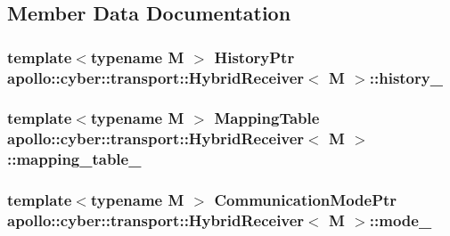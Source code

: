 \subsection{Member Data Documentation}
\hypertarget{classapollo_1_1cyber_1_1transport_1_1HybridReceiver_a71fe92773a83ee153382b6b7f9e8c8a7}{
\subsubsection[{history\-\_\-}]{\setlength{\rightskip}{0pt plus 5cm}template$<$typename M $>$ {\bf History\-Ptr} {\bf apollo\-::cyber\-::transport\-::\-Hybrid\-Receiver}$<$ M $>$\-::history\-\_\-\hspace{0.3cm}{\ttfamily [private]}}}\label{classapollo_1_1cyber_1_1transport_1_1HybridReceiver_a71fe92773a83ee153382b6b7f9e8c8a7}
\hypertarget{classapollo_1_1cyber_1_1transport_1_1HybridReceiver_aee5d1880835e3edba742fbcf89478e2d}{
\subsubsection[{mapping\-\_\-table\-\_\-}]{\setlength{\rightskip}{0pt plus 5cm}template$<$typename M $>$ {\bf Mapping\-Table} {\bf apollo\-::cyber\-::transport\-::\-Hybrid\-Receiver}$<$ M $>$\-::mapping\-\_\-table\-\_\-\hspace{0.3cm}{\ttfamily [private]}}}\label{classapollo_1_1cyber_1_1transport_1_1HybridReceiver_aee5d1880835e3edba742fbcf89478e2d}
\hypertarget{classapollo_1_1cyber_1_1transport_1_1HybridReceiver_a2b1451e2a1668ed26172ebaf33520e58}{
\subsubsection[{mode\-\_\-}]{\setlength{\rightskip}{0pt plus 5cm}template$<$typename M $>$ {\bf Communication\-Mode\-Ptr} {\bf apollo\-::cyber\-::transport\-::\-Hybrid\-Receiver}$<$ M $>$\-::mode\-\_\-\hspace{0.3cm}{\ttfamily [private]}}}\label{classapollo_1_1cyber_1_1transport_1_1HybridReceiver_a2b1451e2a1668ed26172ebaf33520e58}
